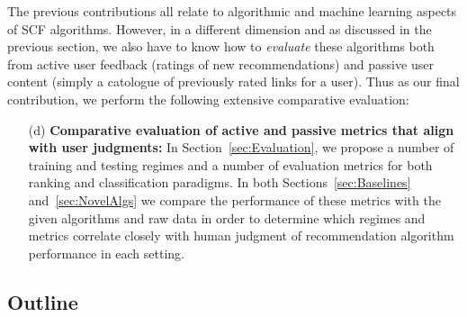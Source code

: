 \documentclass{sig-alternate}
\begin{document}
The previous contributions all relate to algorithmic and machine
learning aspects of SCF algorithms.  However, in a different dimension
and as discussed in the previous section, we also have to know how to
\emph{evaluate} these algorithms both from active user feedback
(ratings of new recommendations) and passive user content (simply a
catologue of previously rated links for a user).  Thus as our final
contribution, we perform the following extensive comparative
evaluation:
\begin{enumerate}
\item[(d)] {\bf Comparative evaluation of active and passive metrics 
that align with user judgments:} 
In Section~\ref{sec:Evaluation}, we
propose a number of training and testing regimes and a number of
evaluation metrics for both ranking and classification paradigms.  In
both Sections~\ref{sec:Baselines} and~\ref{sec:NovelAlgs} we compare
the performance of these metrics with the given algorithms and raw
data in order to determine which regimes and metrics correlate closely
with human judgment of recommendation algorithm
performance in each setting.
\end{enumerate}

\subsection{Outline}
\end{document}
